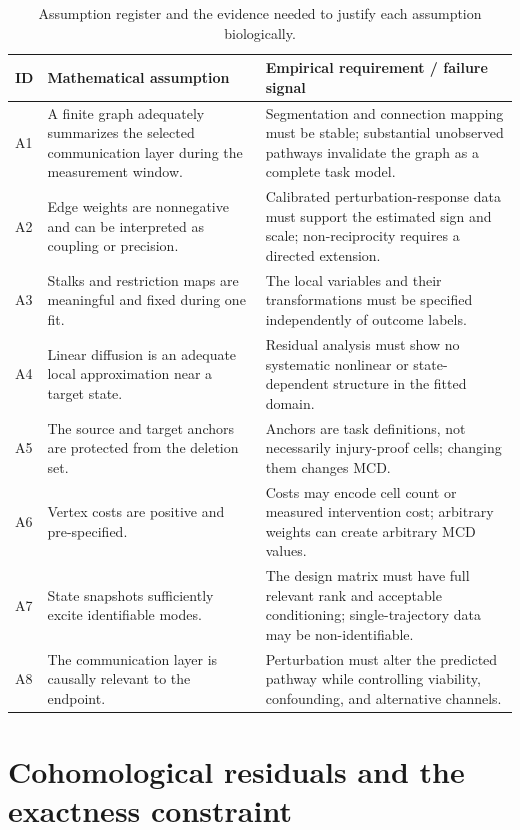 \documentclass[12pt,a4paper]{article}
\begin{document}
\begin{table}[H]
\centering\small
\caption{Assumption register and the evidence needed to justify each assumption biologically.}\label{tab:assumptions}
\begin{tabularx}{\textwidth}{p{}p{}X}
\toprule
ID & Mathematical assumption & Empirical requirement / failure signal\\
\midrule
A1 & A finite graph adequately summarizes the selected communication layer during the measurement window. & Segmentation and connection mapping must be stable; substantial unobserved pathways invalidate the graph as a complete task model.\\
A2 & Edge weights are nonnegative and can be interpreted as coupling or precision. & Calibrated perturbation-response data must support the estimated sign and scale; non-reciprocity requires a directed extension.\\
A3 & Stalks and restriction maps are meaningful and fixed during one fit. & The local variables and their transformations must be specified independently of outcome labels.\\
A4 & Linear diffusion is an adequate local approximation near a target state. & Residual analysis must show no systematic nonlinear or state-dependent structure in the fitted domain.\\
A5 & The source and target anchors are protected from the deletion set. & Anchors are task definitions, not necessarily injury-proof cells; changing them changes MCD.\\
A6 & Vertex costs are positive and pre-specified. & Costs may encode cell count or measured intervention cost; arbitrary weights can create arbitrary MCD values.\\
A7 & State snapshots sufficiently excite identifiable modes. & The design matrix must have full relevant rank and acceptable conditioning; single-trajectory data may be non-identifiable.\\
A8 & The communication layer is causally relevant to the endpoint. & Perturbation must alter the predicted pathway while controlling viability, confounding, and alternative channels.\\
\bottomrule
\end{tabularx}
\end{table}

\section{Cohomological residuals and the exactness constraint}
\end{document}
